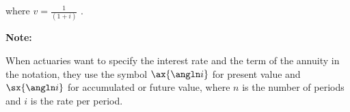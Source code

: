 \documentclass[12pt]{article}
\begin{document}

\begin{flushleft}
    where {\large $ v = \frac{1}{(1+i)} $ }.
\end{flushleft}
\vspace{.1in}

\begin{flushleft}
    \textbf{Note:} \\
\end{flushleft}

\begin{flushleft}
    When actuaries want to specify the interest rate and the term of the annuity in the notation, they use the symbol
    {\Large $ \ax{ \angln i} $} for present value and {\Large $ \sx{ \angln i} $} for accumulated or future value, where
    $ n $ is the number of periods and $ i $ is the rate per period.
\end{flushleft}
\end{document}
